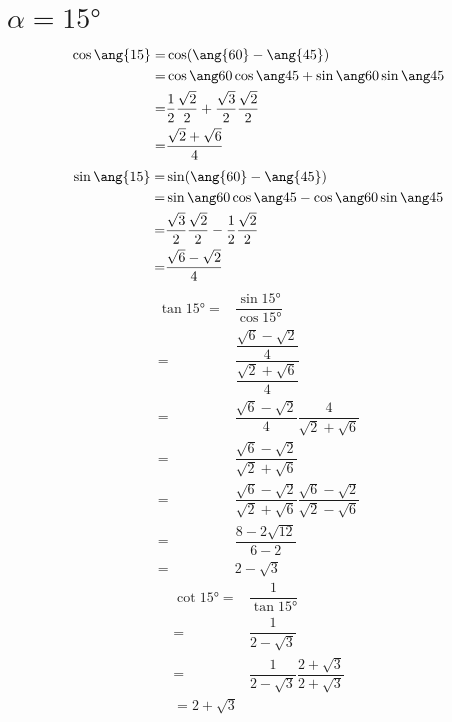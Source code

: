 \section{$\alpha=\ang{15}$}
\begin{align*}
	\cos\ang{15}=&\cos(\ang{60}-\ang{45})\\
	=&\difcos{60}{45}\\
	=&\cossessanta\cosquarantacinque+\sinsessanta\sinquarantecinque\\
	=&\dfrac{\sqrt{2}+\sqrt{6}}{4}\\
\end{align*}
\begin{align*}
	\sin\ang{15}=&\sin(\ang{60}-\ang{45})\\
	=&\difsin{60}{45}\\
	=&\sinsessanta\cosquarantacinque-\cossessanta\sinquarantecinque\\
	=&\dfrac{\sqrt{6}-\sqrt{2}}{4}
\end{align*}
\begin{align*}
	\tan\ang{15}=&\dfrac{\sin\ang{15}}{\cos\ang{15}}\\
	=&\dfrac{\dfrac{\sqrt{6}-\sqrt{2}}{4}}{\dfrac{\sqrt{2}+\sqrt{6}}{4}}\\
	=&\dfrac{\sqrt{6}-\sqrt{2}}{4}\dfrac{4}{\sqrt{2}+\sqrt{6}}\\
	=&\dfrac{\sqrt{6}-\sqrt{2}}{\sqrt{2}+\sqrt{6}}\\
	=&\dfrac{\sqrt{6}-\sqrt{2}}{\sqrt{2}+\sqrt{6}}\dfrac{\sqrt{6}-\sqrt{2}}{\sqrt{2}-\sqrt{6}}\\
	=&\dfrac{8-2\sqrt{12}}{6-2}\\
	=&2-\sqrt{3}
\end{align*}
\begin{align*}
	\cot\ang{15}=&\dfrac{1}{\tan\ang{15}}\\
	=&\dfrac{1}{2-\sqrt{3}}\\
	=&\dfrac{1}{2-\sqrt{3}}\dfrac{2+\sqrt{3}}{2+\sqrt{3}}\\
	=2+\sqrt{3}\\
\end{align*}
